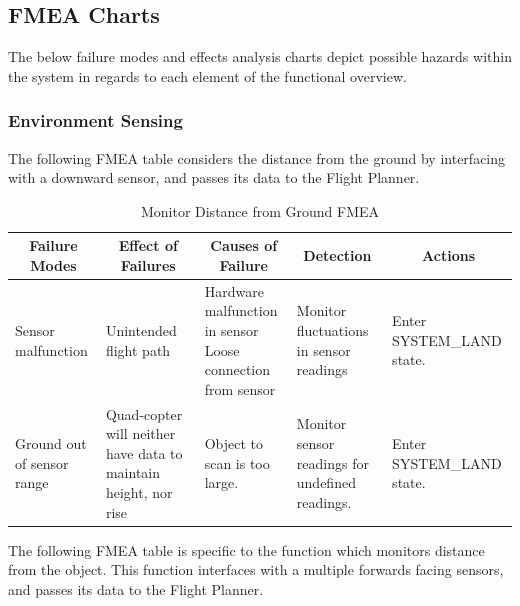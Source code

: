 \documentclass[10pt,letterpaper]{article}
\newcommand{\fmeaheader}{\multicolumn{1}{c}{\textbf{Failure Modes}} & \multicolumn{1}{c}{\textbf{Effect of Failures}} & \multicolumn{1}{c}{\textbf{Causes of Failure}} & \multicolumn{1}{c}{\textbf{Detection}} & \multicolumn{1}{c}{\textbf{Actions}}}
\begin{document}
\subsection{FMEA Charts}
The below failure modes and effects analysis charts depict possible hazards within the system in regards to each element of the  functional overview.
\subsubsection{Environment Sensing}
The following FMEA table considers the distance from the ground by interfacing with a downward sensor, and passes its data to the Flight Planner.
\begin{table}[H]
\footnotesize  
	\begin{adjustwidth}{-1.8in}{-1.8in}  
      \begin{center}
          \begin{tabular}{|p{3cm}p{3cm}p{3cm}p{3cm}p{4.5cm}|}
              \fmeaheader \\ \hline
              Sensor malfunction & 
              Unintended flight path & 
              \parbox[t]{3cm}{Hardware malfunction in sensor\\ Loose connection from sensor} &
              Monitor fluctuations in sensor readings  & 
              Enter SYSTEM\_LAND state. \\ \hline
              
              Ground out of sensor range & 
              Quad-copter will neither have data to maintain height, nor rise & 
              \parbox[t]{3cm}{Object to scan is too large.} &
              Monitor sensor readings for undefined readings.  & 
              Enter SYSTEM\_LAND state. \\ \hline
          \end{tabular}
      \end{center}
      \caption[Monitor Distance from Ground FMEA]{Monitor Distance from Ground FMEA}
    \end{adjustwidth}
\end{table}

The following FMEA table is specific to the function which monitors distance from the object. This function interfaces with a multiple forwards facing sensors, and passes its data to the Flight Planner.
\end{document}
